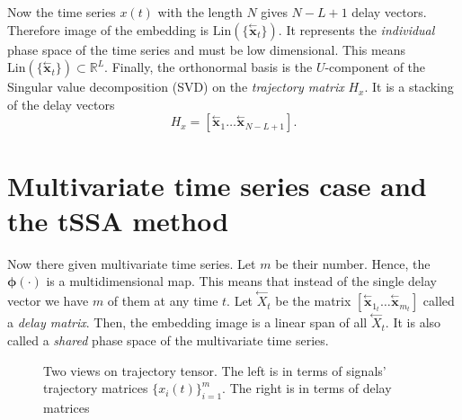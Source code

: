 \documentclass[referee, pdflatex, sn-mathphys-num]{sn-jnl}
\theoremstyle{definition}
\theoremstyle{plain}
\newcommand{\delayV}[1]{\overset{\leftarrow}{\mathbf{x}}_{#1}}
\newcommand{\delayM}[1]{\overset{\leftarrow}{X}_{#1}}
\begin{document}
	Now the time series $ x(t) $ with the length $ N $ gives $ N - L + 1 $ delay vectors. Therefore image of the embedding is $ \text{Lin}(\{\delayV{t}\}) $. It represents the \emph{individual} phase space of the time series and must be low dimensional. This means $ \text{Lin}(\{\delayV{t}\}) \subset \mathbb{R}^L $. Finally, the orthonormal basis is the $ U $-component of the Singular value decomposition (SVD) on the \emph{trajectory matrix} $ H_x $. It is a stacking of the delay vectors	\[
		H_x = [ \delayV{1} \ldots  \delayV{N - L + 1}].
	\]
	
	\section{Multivariate time series case and the tSSA method}\label{sec:tssa_method}
	
	Now there given multivariate time series. Let $ m $ be their number. Hence, the $ \boldsymbol{\phi}(\cdot) $ is a multidimensional map. This means that instead of the single delay vector we have $ m $ of them at any time $ t $. Let $ \delayM{t} $ be the matrix $ [ \delayV{1_t} \ldots \delayV{m_t} ] $ called a \emph{delay matrix}. Then, the embedding image is a linear span of all $ \delayM{t} $. It is also called a \emph{shared} phase space of the multivariate time series.
	
	\begin{figure}[!htbp]
		\centering
		
		\caption{Two views on trajectory tensor. The left is in terms of signals' trajectory matrices $ \{x_i(t)\}_{i=1}^m $. The right is in terms of delay matrices}\label{pic:traj_tensor}
	\end{figure}
	
\end{document}
